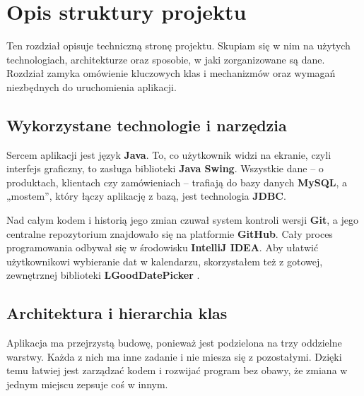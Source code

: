 \chapter{Opis struktury projektu}
\label{chap:struktura_projektu}
Ten rozdział opisuje techniczną stronę projektu. Skupiam się w nim na użytych technologiach, architekturze oraz sposobie, w jaki zorganizowane są dane. Rozdział zamyka omówienie kluczowych klas i mechanizmów oraz wymagań niezbędnych do uruchomienia aplikacji.

\section{Wykorzystane technologie i narzędzia}
Sercem aplikacji jest język \textbf{Java}. To, co użytkownik widzi na ekranie, czyli interfejs graficzny, to zasługa biblioteki \textbf{Java Swing}. Wszystkie dane – o produktach, klientach czy zamówieniach – trafiają do bazy danych \textbf{MySQL}, a „mostem”, który łączy aplikację z bazą, jest technologia \textbf{JDBC}.

Nad całym kodem i historią jego zmian czuwał system kontroli wersji \textbf{Git}, a jego centralne repozytorium znajdowało się na platformie \textbf{GitHub}. Cały proces programowania odbywał się w środowisku \textbf{IntelliJ IDEA}. Aby ułatwić użytkownikowi wybieranie dat w kalendarzu, skorzystałem też z gotowej, zewnętrznej biblioteki \textbf{LGoodDatePicker} \cite{LGoodDatePicker}.

\section{Architektura i hierarchia klas}
Aplikacja ma przejrzystą budowę, ponieważ jest podzielona na trzy oddzielne warstwy. Każda z nich ma inne zadanie i nie miesza się z pozostałymi. Dzięki temu łatwiej jest zarządzać kodem i rozwijać program bez obawy, że zmiana w jednym miejscu zepsuje coś w innym.

